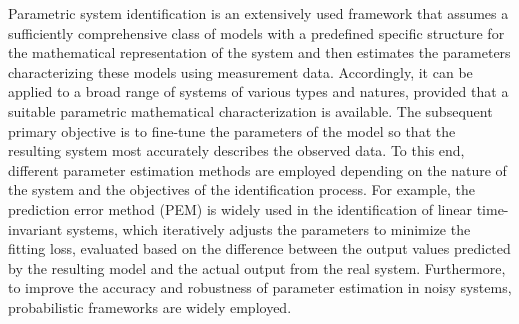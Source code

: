 %
%
%
Parametric system identification is an extensively used framework that assumes a sufficiently comprehensive class of models with a predefined specific structure for the mathematical representation of the system and then estimates the parameters characterizing these models using measurement data. Accordingly, it can be applied to a broad range of systems of various types and natures, provided that a suitable parametric mathematical characterization is available. The subsequent primary objective is to fine-tune the parameters of the model so that the resulting system most accurately describes the observed data.
To this end, different parameter estimation methods are employed depending on the nature of the system and the objectives of the identification process. 
For example, the prediction error method (PEM) \cite{astrom1979maximum}  is widely used in the identification of linear time-invariant systems, which iteratively adjusts the parameters to minimize the fitting loss, evaluated based on the difference between the output values predicted by the resulting model and the actual output from the real system.
Furthermore, to improve the accuracy and robustness of parameter estimation in noisy systems, probabilistic frameworks are widely employed.
